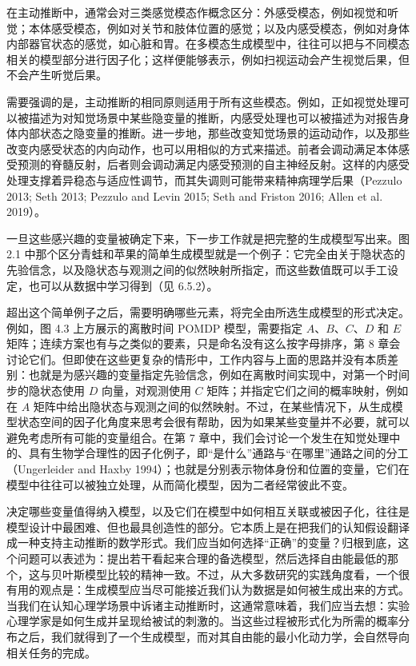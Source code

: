 在主动推断中，通常会对三类感觉模态作概念区分：外感受模态，例如视觉和听觉；本体感受模态，例如对关节和肢体位置的感觉；以及内感受模态，例如对身体内部器官状态的感觉，如心脏和胃。在多模态生成模型中，往往可以把与不同模态相关的模型部分进行因子化；这样便能够表示，例如扫视运动会产生视觉后果，但不会产生听觉后果。

需要强调的是，主动推断的相同原则适用于所有这些模态。例如，正如视觉处理可以被描述为对知觉场景中某些隐变量的推断，内感受处理也可以被描述为对报告身体内部状态之隐变量的推断。进一步地，那些改变知觉场景的运动动作，以及那些改变内感受状态的内向动作，也可以用相似的方式来描述。前者会调动满足本体感受预测的脊髓反射，后者则会调动满足内感受预测的自主神经反射。这样的内感受处理支撑着异稳态与适应性调节，而其失调则可能带来精神病理学后果（Pezzulo 2013; Seth 2013; Pezzulo and Levin 2015; Seth and Friston 2016; Allen et al. 2019）。

一旦这些感兴趣的变量被确定下来，下一步工作就是把完整的生成模型写出来。图 2.1 中那个区分青蛙和苹果的简单生成模型就是一个例子：它完全由关于隐状态的先验信念，以及隐状态与观测之间的似然映射所指定，而这些数值既可以手工设定，也可以从数据中学习得到（见 6.5.2）。

超出这个简单例子之后，需要明确哪些元素，将完全由所选生成模型的形式决定。例如，图 4.3 上方展示的离散时间 POMDP 模型，需要指定 $A$、$B$、$C$、$D$ 和 $E$ 矩阵；连续方案也有与之类似的要素，只是命名没有这么按字母排序，第 8 章会讨论它们。但即使在这些更复杂的情形中，工作内容与上面的思路并没有本质差别：也就是为感兴趣的变量指定先验信念，例如在离散时间实现中，对第一个时间步的隐状态使用 $D$ 向量，对观测使用 $C$ 矩阵；并指定它们之间的概率映射，例如在 $A$ 矩阵中给出隐状态与观测之间的似然映射。不过，在某些情况下，从生成模型状态空间的因子化角度来思考会很有帮助，因为如果某些变量并不必要，就可以避免考虑所有可能的变量组合。在第 7 章中，我们会讨论一个发生在知觉处理中的、具有生物学合理性的因子化例子，即“是什么”通路与“在哪里”通路之间的分工（Ungerleider and Haxby 1994）；也就是分别表示物体身份和位置的变量，它们在模型中往往可以被独立处理，从而简化模型，因为二者经常彼此不变。

决定哪些变量值得纳入模型，以及它们在模型中如何相互关联或被因子化，往往是模型设计中最困难、但也最具创造性的部分。它本质上是在把我们的认知假设翻译成一种支持主动推断的数学形式。我们应当如何选择“正确”的变量？归根到底，这个问题可以表述为：提出若干看起来合理的备选模型，然后选择自由能最低的那个，这与贝叶斯模型比较的精神一致。不过，从大多数研究的实践角度看，一个很有用的观点是：生成模型应当尽可能接近我们认为数据是如何被生成出来的方式。当我们在认知心理学场景中诉诸主动推断时，这通常意味着，我们应当去想：实验心理学家是如何生成并呈现给被试的刺激的。当这些过程被形式化为所需的概率分布之后，我们就得到了一个生成模型，而对其自由能的最小化动力学，会自然导向相关任务的完成。

